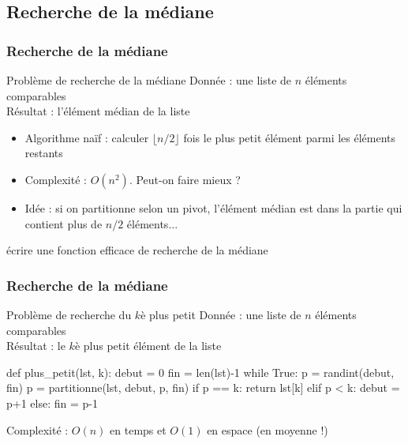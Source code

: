 \documentclass[12pt]{linfo-beamer}
\begin{document}

\subsection{Recherche de la médiane} %
\label{sub:recherche_de_la_médiane}


\begin{frame}
\frametitle{Recherche de la médiane}

\begin{beamerboxesrounded}{Problème de recherche de la médiane}
Donnée : une liste de $n$ éléments comparables\\
Résultat : l'élément médian de la liste
\end{beamerboxesrounded}

\color{gray}{\small (Médiane : autant d'éléments supérieurs que d'éléments inférieurs)}

\begin{itemize}
  \item Algorithme naïf : calculer $\lfloor n/2 \rfloor$ fois le plus petit élément parmi les éléments restants
  \item Complexité : \pause $O(n^2)$. Peut-on faire mieux ? \pause
  \item Idée : si on partitionne selon un pivot, l'élément médian est dans la partie qui contient plus de $n/2$ éléments...
\end{itemize}

 écrire une fonction efficace de recherche de la médiane

\end{frame}

\begin{frame}[fragile]
\frametitle{Recherche de la médiane}

\begin{beamerboxesrounded}{Problème de recherche du $k$è plus petit}
Donnée : une liste de $n$ éléments comparables\\
Résultat : le $k$è plus petit élément de la liste
\end{beamerboxesrounded}

{\footnotesize
\begin{python}
def plus_petit(lst, k):
    debut = 0
    fin = len(lst)-1
    while True:
        p = randint(debut, fin)
        p = partitionne(lst, debut, p, fin)
        if p == k:
            return lst[k]
        elif p < k:
            debut = p+1
        else:
            fin = p-1
\end{python}
}

Complexité : \pause $O(n)$ en temps et $O(1)$ en espace (en moyenne !)

\end{frame}

\end{document}
